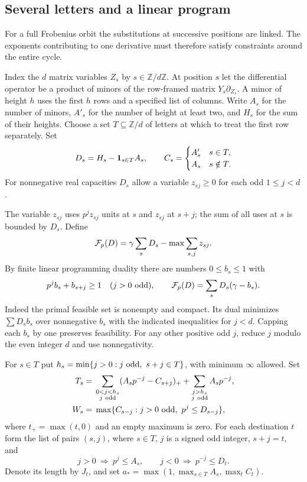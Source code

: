 \subsection{Several letters and a linear program}
\label{subsec:cycle-jets}
\hypertarget{source-cyclic-jets}{}

For a full Frobenius orbit the substitutions at successive positions are linked. The exponents contributing to one derivative must therefore satisfy constraints around the entire cycle.

Index the \(d\) matrix variables \(Z_s\) by \(s\in\mathbb Z/d\mathbb Z\). At position \(s\) let the differential operator be a product of minors of the row-framed
matrix \(Y_s\partial_{Z_s}\). A minor of height \(h\) uses the
first \(h\) rows and a specified list of columns. Write \(A_s\)
for the number of minors, \(A'_s\) for the number of height at
least two, and \(H_s\) for the sum of their heights. Choose a set
\(T\subseteq\mathbb Z/d\) of letters at which to treat the first
row separately. Set
\[
 D_s=H_s-{\bf1}_{s\in T}A_s,\qquad
 C_s=\begin{cases} A'_s&s\in T,\\ A_s&s\notin T.\end{cases}
\]
For nonnegative real capacities \(D_s\) allow a variable
\(z_{sj}\ge0\) for each odd \(1\le j<d\).

The variable \(z_{sj}\) uses \(p^jz_{sj}\) units at \(s\) and \(z_{sj}\) at \(s+j\); the sum of all uses
at \(s\) is bounded by \(D_s\). Define
\[
 {\cal F}_p(D)=\gamma\sum_sD_s-\max\sum_{s,j}z_{sj}.
\]
By finite linear programming duality there are numbers
\(0\le b_s\le1\) with
\begin{equation}\label{eq:flow-dual}
 p^jb_s+b_{s+j}\ge1\quad(j>0\text{ odd}),\qquad
 {\cal F}_p(D)=\sum_sD_s(\gamma-b_s).
\end{equation}
Indeed the primal feasible set is nonempty and compact. Its
dual minimizes \(\sum D_s b_s\) over nonnegative \(b_s\)
with the indicated inequalities for \(j<d\). Capping each
\(b_s\) by one preserves feasibility. For any other positive
odd \(j\), reduce \(j\) modulo the even integer \(d\) and use
nonnegativity.

For \(s\in T\) put \(h_s=\min\{j>0:j\ {\rm odd},\ s+j\in T\}\),
with minimum \(\infty\) allowed. Set
\[
 \begin{split}
 T_s={}&\sum_{\substack{0<j<h_s\\ j\ {\rm odd}}}
                 (A_sp^{-j}-C_{s+j})_+
       +\sum_{\substack{j>h_s\\ j\ {\rm odd}}}A_sp^{-j},\\
 W_s={}&\max\{C_{s-j}: j>0\ {\rm odd},\ p^j\le D_{s-j}\},
 \end{split}
\]
where \(t_+=\max(t,0)\) and an empty maximum is zero. For each
destination \(t\) form the list of pairs \((s,j)\), where
\(s\in T\), \(j\) is a signed odd integer, \(s+j=t\), and
\[
       j>0\ \Longrightarrow\ p^j\le A_s,\qquad
       j<0\ \Longrightarrow\ p^{-j}\le D_t .
\]
Denote its length by \(J_t\), and set
\(a_*=\max(1,\max_{s\in T}A_s,\max_t C_t)\).


